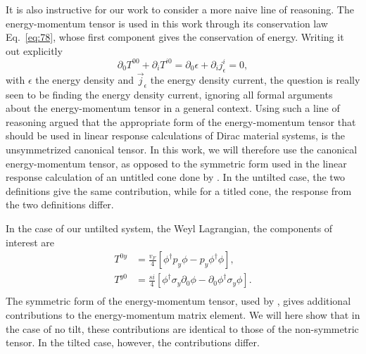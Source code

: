 It is also instructive for our work to consider a more naive line of reasoning.
The energy-momentum tensor is used in this work through its conservation law Eq.~\eqref{eq:78}, whose first component gives the conservation of energy.
Writing it out explicitly
\begin{equation}
  \label{eq:84}
  \partial_0T^{00} + \partial_i T^{i0} = \partial_0 \epsilon + \partial_i j^i_{\epsilon} = 0,
\end{equation}
with \( \epsilon \) the energy density and \( \vec{j}_{\epsilon} \) the energy density current, the question is really seen to be finding the energy density current, ignoring all formal arguments about the energy-momentum tensor in a general context.
Using such a line of reasoning \textcite{vanderwurffMagnetovorticalThermoelectricTransport2019} argued that the appropriate form of the energy-momentum tensor that should be used in linear response calculations of Dirac material systems, is the unsymmetrized canonical tensor.
In this work, we will therefore use the canonical energy-momentum tensor, as opposed to the symmetric form used in the linear response calculation of an untitled cone done by \textcite{arjonaFingerprintsConformalAnomaly2019}.
In the untilted case, the two definitions give the same contribution, while for a titled cone, the response from the two definitions differ.

In the case of our untilted system, the Weyl Lagrangian, the components of interest are
\begin{align}
  \label{eq:85}
  T^{0 y} &= \frac{v_F}{4}
  \left[
  \phi^{\dagger} p_y \phi - p_y \phi^{\dagger} \phi
  \right],\\
  T^{y 0} &= \frac{s i}{4}
  \left[
  \phi^{\dagger} \sigma_y \partial_{0} \phi - \partial_0 \phi^{\dagger} \sigma_y \phi
  \right].\\
\end{align}
The symmetric form of the energy-momentum tensor, used by \textcite{arjonaFingerprintsConformalAnomaly2019}, gives additional contributions to the energy-momentum matrix element.
We will here show that in the case of no tilt, these contributions are identical to those of the non-symmetric tensor.
In the tilted case, however, the contributions differ.


